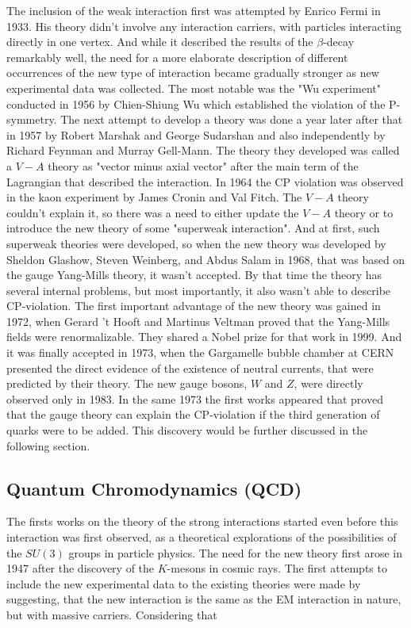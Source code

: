 The inclusion of the weak interaction first was attempted by Enrico Fermi in 1933. His theory didn't involve any interaction carriers, with particles interacting directly in one vertex. And while it described the results of the $\beta$-decay remarkably well, the need for a more elaborate description of different occurrences of the new type of interaction became gradually stronger as new experimental data was collected. The most notable was the "Wu experiment" conducted in 1956 by Chien-Shiung Wu which established the violation of the P-symmetry. The next attempt to develop a theory was done a year later after that in 1957 by Robert Marshak and George Sudarshan and also independently by Richard Feynman and Murray Gell-Mann. The theory they developed was called a $V-A$ theory as "vector minus axial vector" after the main term of the Lagrangian that described the interaction. In 1964 the CP violation was observed in the kaon experiment by James Cronin and Val Fitch. The $V-A$ theory couldn't explain it, so there was a need to either update the $V-A$ theory or to introduce the new theory of some "superweak interaction". And at first, such superweak theories were developed, so when the new theory was developed by Sheldon Glashow, Steven Weinberg, and Abdus Salam in 1968, that was based on the gauge Yang-Mills theory, it wasn't accepted. By that time the theory has several internal problems, but most importantly, it also wasn't able to describe CP-violation. The first important advantage of the new theory was gained in 1972, when Gerard 't Hooft and Martinus Veltman proved that the Yang-Mills fields were renormalizable. They shared a Nobel prize for that work in 1999. And it was finally accepted in 1973, when the Gargamelle bubble chamber at CERN presented the direct evidence of the existence of neutral currents, that were predicted by their theory. The new gauge bosons, $W$ and $Z$, were directly observed only in 1983. In the same 1973 the first works appeared that proved that the gauge theory can explain the CP-violation if the third generation of quarks were to be added. This discovery would be further discussed in the following section.

\subsection{Quantum Chromodynamics (QCD)}

The firsts works on the theory of the strong interactions started even before this interaction was first observed, as a theoretical explorations of the possibilities of the $SU(3)$ groups in particle physics. The need for the new theory first arose in 1947 after the discovery of the $K$-mesons in cosmic rays. The first attempts to include the new experimental data to the existing theories were made by suggesting, that the new interaction is the same as the EM interaction in nature, but with massive carriers. Considering that

